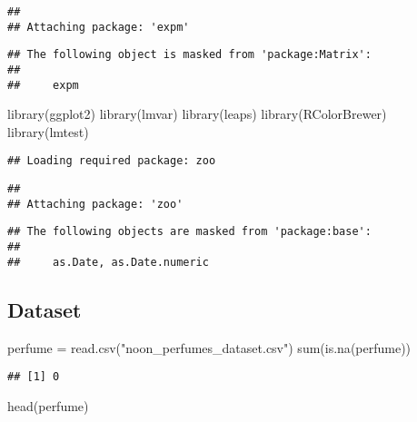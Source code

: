 \documentclass[
]{article}
\newenvironment{Shaded}{\begin{snugshade}}{\end{snugshade}}
\newcommand{\FunctionTok}[1]{\textcolor[rgb]{0.00,0.00,0.00}{#1}}
\newcommand{\NormalTok}[1]{#1}
\newcommand{\OtherTok}[1]{\textcolor[rgb]{0.56,0.35,0.01}{#1}}
\newcommand{\StringTok}[1]{\textcolor[rgb]{0.31,0.60,0.02}{#1}}
\begin{document}
\begin{verbatim}
## 
## Attaching package: 'expm'
\end{verbatim}

\begin{verbatim}
## The following object is masked from 'package:Matrix':
## 
##     expm
\end{verbatim}

\begin{Shaded}
\begin{Highlighting}[]
\FunctionTok{library}\NormalTok{(ggplot2)}
\FunctionTok{library}\NormalTok{(lmvar)}
\FunctionTok{library}\NormalTok{(leaps)}
\FunctionTok{library}\NormalTok{(RColorBrewer)}
\FunctionTok{library}\NormalTok{(lmtest)}
\end{Highlighting}
\end{Shaded}

\begin{verbatim}
## Loading required package: zoo
\end{verbatim}

\begin{verbatim}
## 
## Attaching package: 'zoo'
\end{verbatim}

\begin{verbatim}
## The following objects are masked from 'package:base':
## 
##     as.Date, as.Date.numeric
\end{verbatim}

\hypertarget{dataset}{%
\subsection{Dataset}\label{dataset}}

\begin{Shaded}
\begin{Highlighting}[]
\NormalTok{perfume }\OtherTok{=} \FunctionTok{read.csv}\NormalTok{(}\StringTok{"noon\_perfumes\_dataset.csv"}\NormalTok{)}
\FunctionTok{sum}\NormalTok{(}\FunctionTok{is.na}\NormalTok{(perfume))}
\end{Highlighting}
\end{Shaded}

\begin{verbatim}
## [1] 0
\end{verbatim}

\begin{Shaded}
\begin{Highlighting}[]
\FunctionTok{head}\NormalTok{(perfume)}
\end{Highlighting}
\end{Shaded}
\end{document}
